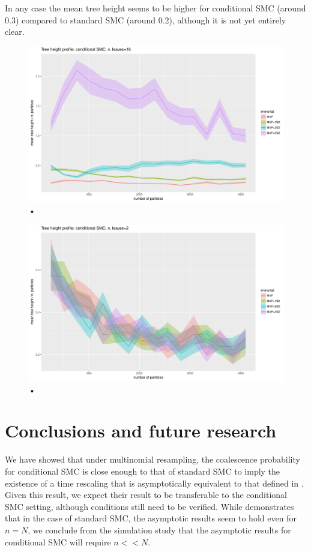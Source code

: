 \documentclass{article}
\begin{document}
In any case the mean tree height seems to be higher for conditional SMC (around 0.3) compared to standard SMC (around 0.2), although it is not yet entirely clear.

\begin{figure}
\centering
\includegraphics[width=\textwidth]{kalman_n16_100reps_line.pdf}
\caption{•}
\label{fig:kalman_n16}
\end{figure}
\begin{figure}
\centering
\includegraphics[width=\textwidth]{kalman_n2_1000reps_line.pdf}
\caption{•}
\label{fig:kalman_n2}
\end{figure}

\section{Conclusions and future research}
We have showed that under multinomial resampling, the coalescence probability for conditional SMC is close enough to that of standard SMC to imply the existence of a time rescaling that is asymptotically equivalent to that defined in \citet[p.7]{koskela2018}. Given this result, we expect their result to be transferable to the conditional SMC setting, although conditions \citet[(3)--(4)]{koskela2018} still need to be verified.
While \citet[Section 3]{koskela2018} demonstrates that in the case of standard SMC, the asymptotic results seem to hold even for $n=N$, we conclude from the simulation study that the asymptotic results for conditional SMC will require $n << N$.
\end{document}
